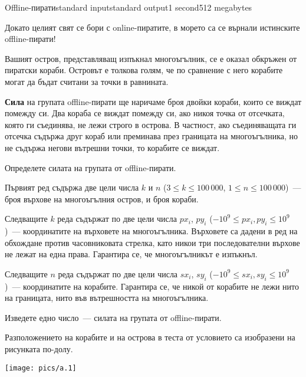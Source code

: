 \begin{problem}{Offline-пирати}{standard input}{standard output}{1 second}{512 megabytes}

Докато целият свят се бори с online-пиратите, в морето са се върнали истинските offline-пирати! 

Вашият остров, представляващ изпъкнал многоъгълник, се е оказал обкръжен от пиратски кораби. Островът е толкова голям, че по сравнение с него корабите могат да бъдат считани за точки в равнината. 

\textbf{Сила} на групата offline-пирати ще наричаме броя двойки кораби, които се виждат помежду си. Два кораба се виждат помежду си, ако никоя точка от отсечката, която ги съединява, не лежи строго в острова. В частност, ако съединяващата ги отсечка съдържа друг кораб или преминава през границата на многоъгълника, но не съдържа негови вътрешни точки, то корабите се виждат.

Определете силата на групата от offline-пирати.


\InputFile
Първият ред съдържа две цели числа $k$ и $n$ ($3 \leq k \leq 100\,000$, $1 \leq n \leq 100\,000$)~--- броя върхове на многоъгълния остров, и броя кораби.

Следващите $k$ реда съдържат по две цели числа $px_i$, $py_i$ ($-10^9 \leq px_i, py_i \leq 10^9$)~--- координатите на върховете на многоъгълника. Върховете са дадени в ред на обхождане против часовниковата стрелка, като никои три последователни върхове не лежат на една права. Гарантира се, че многоъгълникът е изпъкнъл.

Следващите $n$ реда съдържат по две цели числа $sx_i$, $sy_i$ ($-10^9 \leq sx_i, sy_i \leq 10^9$)~--- координатите на корабите. Гарантира се, че никой от корабите не лежи нито на границата, нито във вътрешността на многоъгълника.

\OutputFile
Изведете едно число~--- силата на групата от offline-пирати.


\Example

\begin{example}
%
\end{example}

\Note
Разположението на корабите и на острова в теста от условието са изобразени на рисунката по-долу.

\begin{center}
\texttt{[image: pics/a.1]}
\end{center}



\end{problem}
